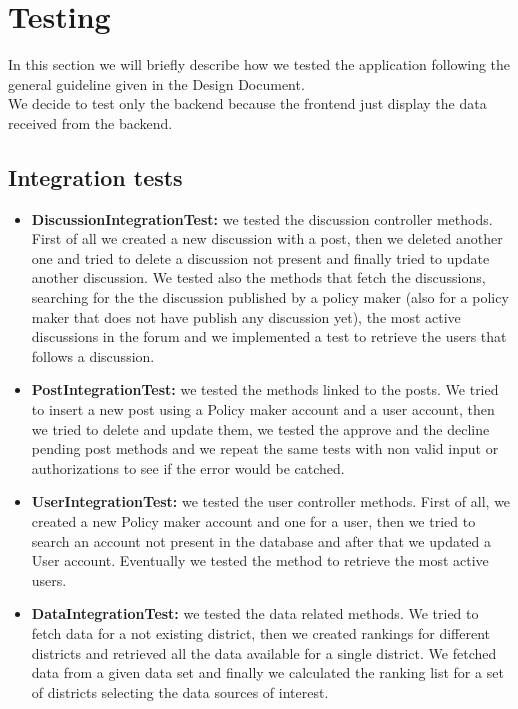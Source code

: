 \section{Testing}
In this section we will briefly describe how we tested the application following the general guideline given in the Design Document.\\
We decide to test only the backend because the frontend just display the data received from the backend.

\subsection{Integration tests}
\begin{itemize}
    \item \textbf{DiscussionIntegrationTest:} we tested the discussion controller methods. First of all we created a new discussion with a post, then we deleted another one and tried to delete a discussion not present  and finally tried to update another discussion. We tested also the methods that fetch the discussions, searching for the the discussion published by a policy maker (also for a policy maker that does not have publish any discussion yet), the most active discussions in the forum and we implemented a test to retrieve the users that follows a discussion.
    \item \textbf{PostIntegrationTest:} we tested the methods linked to the posts. We tried to insert a new post using a Policy maker account and a user account, then we tried to delete and update them, we tested the approve and the decline pending post methods and we repeat the same tests with non valid input or authorizations to see if the error would be catched.
    \item \textbf{UserIntegrationTest:} we tested the user controller methods. First of all, we created a new Policy maker account and one for a user, then we tried to search an account not present in the database and after that we updated a User account. Eventually we tested the method to retrieve the most active users.
    \item \textbf{DataIntegrationTest:} we tested the data related methods. We tried to fetch data for a not existing district, then we created rankings for different districts and retrieved all the data available for a single district. We fetched data from a given data set and finally we calculated the ranking list for a set of districts selecting the data sources of interest.
\end{itemize}

